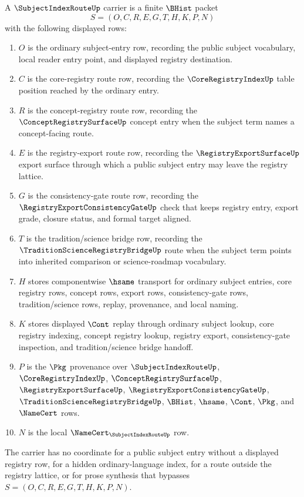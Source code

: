 \begin{definition}
\label{def:subject-index-route-carrier}
A $\SubjectIndexRouteUp$ carrier is a finite $\BHist$ packet
$$
S=(O,C,R,E,G,T,H,K,P,N)
$$
with the following displayed rows:
\begin{enumerate}
\item $O$ is the ordinary subject-entry row, recording the public subject vocabulary, local reader entry point, and displayed registry destination.
\item $C$ is the core-registry route row, recording the $\CoreRegistryIndexUp$ table position reached by the ordinary entry.
\item $R$ is the concept-registry route row, recording the $\ConceptRegistrySurfaceUp$ concept entry when the subject term names a concept-facing route.
\item $E$ is the registry-export route row, recording the $\RegistryExportSurfaceUp$ export surface through which a public subject entry may leave the registry lattice.
\item $G$ is the consistency-gate route row, recording the $\RegistryExportConsistencyGateUp$ check that keeps registry entry, export grade, closure status, and formal target aligned.
\item $T$ is the tradition/science bridge row, recording the $\TraditionScienceRegistryBridgeUp$ route when the subject term points into inherited comparison or science-roadmap vocabulary.
\item $H$ stores componentwise $\hsame$ transport for ordinary subject entries, core registry rows, concept rows, export rows, consistency-gate rows, tradition/science rows, replay, provenance, and local naming.
\item $K$ stores displayed $\Cont$ replay through ordinary subject lookup, core registry indexing, concept registry lookup, registry export, consistency-gate inspection, and tradition/science bridge handoff.
\item $P$ is the $\Pkg$ provenance over $\SubjectIndexRouteUp$, $\CoreRegistryIndexUp$, $\ConceptRegistrySurfaceUp$, $\RegistryExportSurfaceUp$, $\RegistryExportConsistencyGateUp$, $\TraditionScienceRegistryBridgeUp$, $\BHist$, $\hsame$, $\Cont$, $\Pkg$, and $\NameCert$ rows.
\item $N$ is the local $\NameCert_{\SubjectIndexRouteUp}$ row.
\end{enumerate}
The carrier has no coordinate for a public subject entry without a displayed registry row, for a hidden ordinary-language index, for a route outside the registry lattice, or for prose synthesis that bypasses $S=(O,C,R,E,G,T,H,K,P,N)$.
\end{definition}

